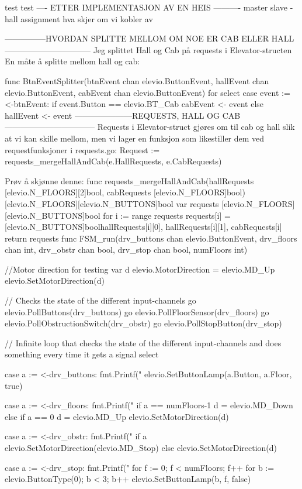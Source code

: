test test
---- ETTER IMPLEMENTASJON AV EN HEIS ----------
master slave - hall assignment
hva skjer om vi kobler av


---------------HVORDAN SPLITTE MELLOM OM NOE ER CAB ELLER HALL--------------------------------
Jeg splittet Hall og Cab på requests i Elevator-structen
En måte å splitte mellom hall og cab:

func BtnEventSplitter(btnEvent chan elevio.ButtonEvent,
	hallEvent chan elevio.ButtonEvent,
	cabEvent chan elevio.ButtonEvent) {
	for {
		select {
		case event := <-btnEvent:
			if event.Button == elevio.BT_Cab {
				cabEvent <- event
			} else {
				hallEvent <- event
			}
		}
	}
}
---------------------REQUESTS, HALL OG CAB---------------------------------
Requests i Elevator-struct gjøres om til cab og hall slik at vi kan skille mellom, men vi lager en funksjon 
som likestiller dem ved requestfunksjoner i requests.go:
Request := requests_mergeHallAndCab(e.HallRequests, e.CabRequests)

Prøv å skjønne denne: 
func requests_mergeHallAndCab(hallRequests [elevio.N_FLOORS][2]bool, cabRequests [elevio.N_FLOORS]bool) [elevio.N_FLOORS][elevio.N_BUTTONS]bool {
	var requests [elevio.N_FLOORS][elevio.N_BUTTONS]bool
	for i := range requests {
		requests[i] = [elevio.N_BUTTONS]bool{hallRequests[i][0], hallRequests[i][1], cabRequests[i]}
	}
	return requests
}
func FSM_run(drv_buttons chan elevio.ButtonEvent, drv_floors chan int, drv_obstr chan bool, drv_stop chan bool, numFloors int) {

	//Motor direction for testing
	var d elevio.MotorDirection = elevio.MD_Up
	elevio.SetMotorDirection(d)


	// Checks the state of the different input-channels
	go elevio.PollButtons(drv_buttons)
	go elevio.PollFloorSensor(drv_floors)
	go elevio.PollObstructionSwitch(drv_obstr)
	go elevio.PollStopButton(drv_stop)

	// Infinite loop that checks the state of the different input-channels and does something every time it gets a signal
	select {
	case a := <-drv_buttons:
		fmt.Printf("%
		elevio.SetButtonLamp(a.Button, a.Floor, true)

	case a := <-drv_floors:
		fmt.Printf("%
		if a == numFloors-1 {
			d = elevio.MD_Down
		} else if a == 0 {
			d = elevio.MD_Up
		}
		elevio.SetMotorDirection(d)

	case a := <-drv_obstr:
		fmt.Printf("%
		if a {
			elevio.SetMotorDirection(elevio.MD_Stop)
		} else {
			elevio.SetMotorDirection(d)
		}

	case a := <-drv_stop:
		fmt.Printf("%
		for f := 0; f < numFloors; f++ {
			for b := elevio.ButtonType(0); b < 3; b++ {
				elevio.SetButtonLamp(b, f, false)
			}
		}
	}

}

